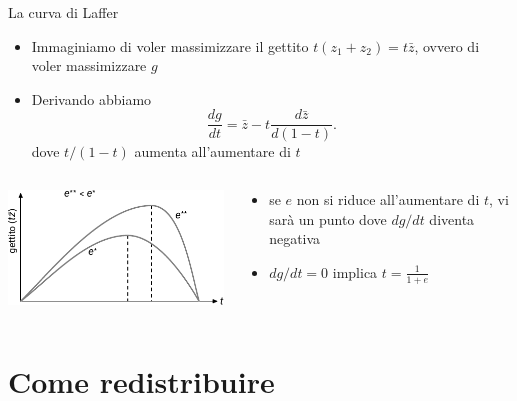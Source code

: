 \documentclass[aspectratio=64,11pt]{beamer}
\begin{document}
\begin{frame}{La curva di Laffer}
\begin{itemize}
\item Immaginiamo di voler massimizzare il gettito $t(z_1+z_2)=t\bar{z}$, ovvero di voler
massimizzare $g$
\item Derivando abbiamo
\begin{equation*}
  \frac{dg}{dt}=\bar{z}-t\frac{d\bar{z}}{d(1-t)}.
\end{equation*}
dove $t/(1-t)$ aumenta all'aumentare di $t$
\end{itemize}

\begin{columns}
\begin{column}{.45\columnwidth}
\begin{center}
\includegraphics[width=\textwidth]{./figure/laffer-1.pdf}
\end{center}
\end{column}

\begin{column}{.45\columnwidth}
\begin{itemize}
\item se $e$ non si riduce all'aumentare di $t$, vi sarà un punto dove $dg/dt$ diventa negativa
\item $dg/dt=0$ implica $t=\frac{1}{1+e}$
\end{itemize}
\end{column}
\end{columns}
\end{frame}

\section{Come redistribuire}
\end{document}
